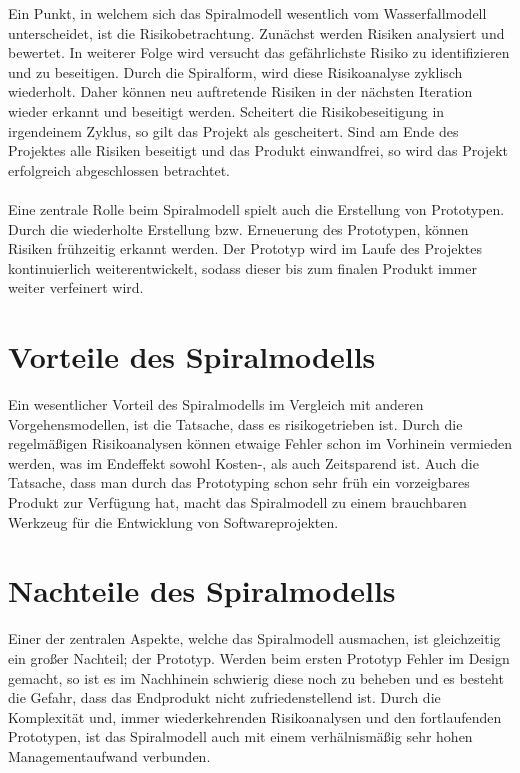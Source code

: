 \documentclass[a4paper, twopage]{scrreprt}
\begin{document}
Ein Punkt, in welchem sich das Spiralmodell wesentlich vom Wasserfallmodell unterscheidet, ist die Risikobetrachtung. Zunächst werden Risiken analysiert und bewertet. In weiterer Folge wird versucht das gefährlichste Risiko zu identifizieren und zu beseitigen.
Durch die Spiralform, wird diese Risikoanalyse zyklisch wiederholt. Daher können neu auftretende Risiken in der nächsten Iteration wieder erkannt und beseitigt werden. Scheitert die Risikobeseitigung in irgendeinem Zyklus, so gilt das Projekt als gescheitert. Sind am Ende des Projektes alle Risiken beseitigt und das Produkt einwandfrei, so wird das Projekt erfolgreich abgeschlossen betrachtet.
\paragraph*{}
Eine zentrale Rolle beim Spiralmodell spielt auch die Erstellung von Prototypen. Durch die wiederholte Erstellung bzw. Erneuerung des Prototypen, können Risiken frühzeitig erkannt werden. Der Prototyp wird im Laufe des Projektes kontinuierlich weiterentwickelt, sodass dieser bis zum finalen Produkt immer weiter verfeinert wird.
\section{Vorteile des Spiralmodells}
\label{sec:spiralmodell_vortile}
Ein wesentlicher Vorteil des Spiralmodells im Vergleich mit anderen Vorgehensmodellen, ist die Tatsache, dass es risikogetrieben ist. Durch die regelmäßigen Risikoanalysen können etwaige Fehler schon im Vorhinein vermieden werden, was im Endeffekt sowohl Kosten-, als auch Zeitsparend ist. Auch die Tatsache, dass man durch das Prototyping schon sehr früh ein vorzeigbares Produkt zur Verfügung hat, macht das Spiralmodell zu einem brauchbaren Werkzeug für die Entwicklung von Softwareprojekten.

\section{Nachteile des Spiralmodells}
\label{sec:spiralmodell_nachteile}
Einer der zentralen Aspekte, welche das Spiralmodell ausmachen, ist gleichzeitig ein großer Nachteil; der Prototyp. Werden beim ersten Prototyp Fehler im Design gemacht, so ist es im Nachhinein schwierig diese noch zu beheben und es besteht die Gefahr, dass das Endprodukt nicht zufriedenstellend ist. 
Durch die Komplexität und, immer wiederkehrenden Risikoanalysen und den fortlaufenden Prototypen, ist das Spiralmodell auch mit einem verhälnismäßig sehr hohen Managementaufwand verbunden.
\end{document}
